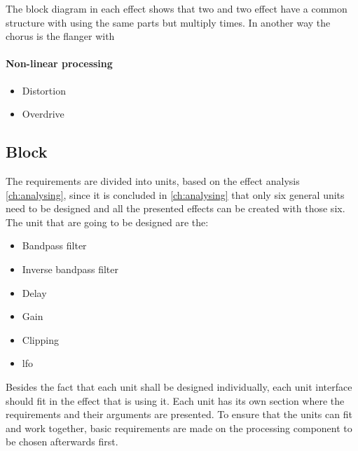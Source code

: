 The block diagram in each effect shows that two and two effect have a common structure with using the same parts but multiply times. In another way the chorus is the flanger with 

\paragraph{Non-linear processing}
\begin{itemize}
	\item Distortion
	\item Overdrive
\end{itemize} 

\subsection{Block}

The requirements are divided into units, based on the effect analysis \autoref{ch:analysing}, since it is concluded in \autoref{ch:analysing} that only six general units need to be designed and all the presented effects can be created with those six. The unit that are going to be designed are the:



\begin{itemize}
	\item Bandpass filter
	\item Inverse bandpass filter
	\item Delay
	\item Gain
	\item Clipping
	\item \gls{lfo}
\end{itemize} 

 Besides the fact that each unit shall be designed individually, each unit interface should fit in the effect that is using it. Each unit has its own section where the requirements and their arguments are presented. To ensure that the units can fit and work together, basic requirements  are made on the processing component to be chosen afterwards first.
 
 
